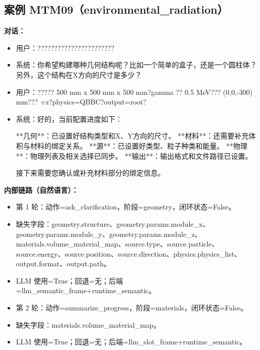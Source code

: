 \documentclass[11pt]{ctexart}
\begin{document}
\subsection{案例 MTM09（environmental\_radiation）}
\textbf{对话：}
\begin{itemize}
\item 用户：???????????????????????
\item 系统：你希望构建哪种几何结构呢？比如一个简单的盒子，还是一个圆柱体？另外，这个结构在X方向的尺寸是多少？
\item 用户：????? 500 mm x 500 mm x 500 mm?gamma ?? 0.5 MeV??? (0,0,-300) mm??? +z?physics=QBBC?output=root?
\item 系统：好的，当前配置进度如下：

**几何**：已设置好结构类型和X、Y方向的尺寸。
**材料**：还需要补充体积与材料的绑定关系。
**源**：已设置好类型、粒子种类和能量。
**物理**：物理列表及相关选择已同步。
**输出**：输出格式和文件路径已设置。

接下来需要您确认或补充材料部分的绑定信息。
\end{itemize}
\textbf{内部链路（自然语言）：}
\begin{itemize}
\item 第 1 轮：动作=ask\_clarification，阶段=geometry，闭环状态=False。
\item 缺失字段：geometry.structure、geometry.params.module\_x、geometry.params.module\_y、geometry.params.module\_z、materials.volume\_material\_map、source.type、source.particle、source.energy、source.position、source.direction、physics.physics\_list、output.format、output.path。
\item LLM 使用=True；回退=无；后端=llm\_semantic\_frame+runtime\_semantic。
\item 第 2 轮：动作=summarize\_progress，阶段=materials，闭环状态=False。
\item 缺失字段：materials.volume\_material\_map。
\item LLM 使用=True；回退=无；后端=llm\_slot\_frame+runtime\_semantic。
\end{itemize}
\end{document}
